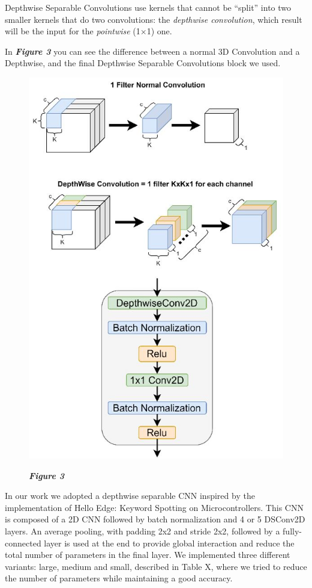\documentclass[conference]{IEEEtran}
\begin{document}
Depthwise Separable Convolutions use kernels that cannot be “split” into two smaller kernels that do two convolutions: the \textit{depthwise convolution}, which result will be the input for the \textit{pointwise} (1$\times$1) one.

In \textbf{\textit{Figure 3}} you can see the difference between a normal 3D Convolution and a Depthwise, and the final Depthwise Separable Convolutions block we used. 

\begin{figure}
\centering
\includegraphics[scale=0.5]{confronto}
\begin{small}\textit{\textbf{Figure 3}}
\end{small}
\end{figure}

In our work we adopted a depthwise separable CNN inspired by the implementation of Hello Edge: Keyword Spotting on Microcontrollers.
This CNN is composed of a 2D CNN followed by batch normalization and 4 or 5 DSConv2D layers. An average pooling, with padding 2x2 and stride 2x2, followed by a fully-connected layer is used at the end to provide global interaction and reduce the total number of parameters in the final layer.
We implemented three different variants: large, medium and small, described in Table X, where we tried to reduce the number of parameters while maintaining a good accuracy.
\end{document}
